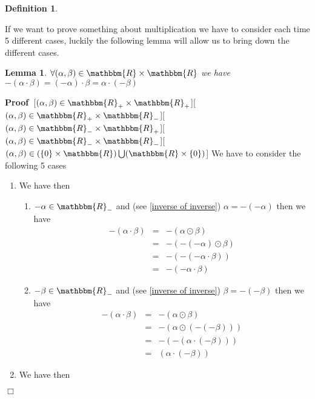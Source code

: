 \documentclass{book}
\newcommand{\um}{-}
\newenvironment{proof}{\noindent\textbf{Proof\ }}{\hspace*{\fill}$\Box$\medskip}
\newtheorem{definition}{Definition}
{\theorembodyfont{\rmfamily}\newtheorem{example}{Example}}
\newtheorem{lemma}{Lemma}
\begin{document}
{{\begin{definition}
\end{definition}

If we want to prove something about multiplication we have to consider each
time 5 different cases, luckily the following lemma will allow us to bring
down the different cases.

\begin{lemma}
  \label{lemma to help prove that the reals forms a field}$\forall (\alpha,
  \beta) \in \mathbbm{R} \times \mathbbm{R}$ we have $- (\alpha \cdot \beta) =
  (\um \alpha) \cdot \beta = \alpha \cdot (- \beta)$
\end{lemma}

\begin{proof}[$(\alpha, \beta) \in \mathbbm{R}_+ \times
\mathbbm{R}_+$][$(\alpha, \beta) \in \mathbbm{R}_+ \times
\mathbbm{R}_-$][$(\alpha, \beta) \in \mathbbm{R}_- \times
\mathbbm{R}_+$][$(\alpha, \beta) \in \mathbbm{R}_- \times
\mathbbm{R}_-$][$(\alpha, \beta) \in (\{ 0 \} \times \mathbbm{R}) \bigcup
(\mathbbm{R} \times \{ 0 \})$]
  We have to consider the following 5 cases
  \begin{enumerate}
    \item We have then
    \begin{enumerate}
      \item $\um \alpha \in \mathbbm{R}_-$ and (see \ref{inverse of inverse})
      $\alpha = - (- \alpha)$ then we have
      \begin{eqnarray*}
        - (\alpha \cdot \beta) & = & - (\alpha \odot \beta)\\
        & = & - (- (- \alpha) \odot \beta)\\
        & = & - (- (- \alpha \cdot \beta))\\
        & = & - (- \alpha \cdot \beta)
      \end{eqnarray*}
      \item $- \beta \in \mathbbm{R}_-$ and (see \ref{inverse of inverse})
      $\beta = \um (\um \beta)$ then we have
      \begin{eqnarray*}
        - (\alpha \cdot \beta) & = & - (\alpha \odot \beta)\\
        & = & - (\alpha \odot (\um (\um \beta)))\\
        & = & - (- (\alpha \cdot (- \beta)))\\
        & = & (\alpha \cdot (- \beta))
      \end{eqnarray*}
    \end{enumerate}
    \item We have then

\end{enumerate}
\end{proof}}}
\end{document}
